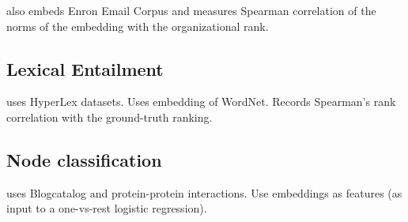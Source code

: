 \documentclass{article}
\begin{document}
\cite{nickel2018learning} also embeds Enron Email Corpus and measures Spearman correlation of the norms of the embedding with
the organizational rank.

 
\subsection{Lexical Entailment}

\cite{nickel2017poincare} uses HyperLex datasets. Uses embedding of WordNet. Records Spearman’s rank correlation
with the ground-truth ranking. 

\subsection{Node classification}

\cite{goyal2018graph} uses Blogcatalog and protein-protein interactions. Use embeddings as features (as input to a one-vs-rest logistic regression).





\end{document}
